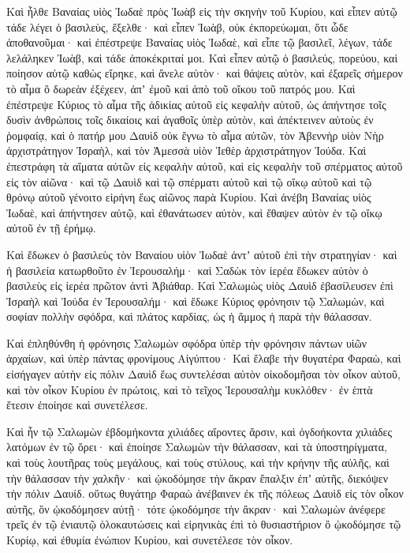 {\par }{\PP {}Καὶ ἦλθε Βαναίας υἱὸς Ἰωδαὲ πρὸς Ἰωὰβ εἰς τὴν σκηνὴν τοῦ Κυρίου, καὶ εἶπεν αὐτῷ τάδε λέγει ὁ βασιλεὺς, ἔξελθε· καὶ εἶπεν Ἰωὰβ, οὐκ ἐκπορεύωμαι, ὅτι ὧδε ἀποθανοῦμαι· καὶ ἐπέστρεψε Βαναίας υἱὸς Ἰωδαὲ, καὶ εἶπε τῷ βασιλεῖ, λέγων, τάδε λελάληκεν Ἰωὰβ, καὶ τάδε ἀποκέκριταί μοι.
Καὶ εἶπεν αὐτῷ ὁ βασιλεύς, πορεύου, καὶ ποίησον αὐτῷ καθὼς εἴρηκε, καὶ ἄνελε αὐτὸν· καὶ θάψεις αὐτὸν, καὶ ἐξαρεῖς σήμερον τὸ αἷμα ὃ δωρεὰν ἐξέχεεν, ἀπʼ ἐμοῦ καὶ ἀπὸ τοῦ οἴκου τοῦ πατρός μου.
Καὶ ἐπέστρεψε Κύριος τὸ αἷμα τῆς ἀδικίας αὐτοῦ εἰς κεφαλὴν αὐτοῦ, ὡς ἀπήντησε τοῖς δυσὶν ἀνθρώποις τοῖς δικαίοις καὶ ἀγαθοῖς ὑπὲρ αὐτὸν, καὶ ἀπέκτεινεν αὐτοὺς ἐν ῥομφαίᾳ, καὶ ὁ πατήρ μου Δαυὶδ οὐκ ἔγνω τὸ αἷμα αὐτῶν, τὸν Ἀβεννὴρ υἱὸν Νὴρ ἀρχιστράτηγον Ἰσραὴλ, καὶ τὸν Ἀμεσσὰ υἱὸν Ἰεθὲρ ἀρχιστράτηγον Ἰούδα.
Καὶ ἐπεστράφη τὰ αἵματα αὐτῶν εἰς κεφαλὴν αὐτοῦ, καὶ εἰς κεφαλὴν τοῦ σπέρματος αὐτοῦ εἰς τὸν αἰῶνα· καὶ τῷ Δαυὶδ καὶ τῷ σπέρματι αὐτοῦ καὶ τῷ οἴκῳ αὐτοῦ καὶ τῷ θρόνῳ αὐτοῦ γένοιτο εἰρήνη ἕως αἰῶνος παρὰ Κυρίου.
Καὶ ἀνέβη Βαναίας υἱὸς Ἰωδαὲ, καὶ ἀπήντησεν αὐτῷ, καὶ ἐθανάτωσεν αὐτὸν, καὶ ἔθαψεν αὐτὸν ἐν τῷ οἴκῳ αὐτοῦ ἐν τῇ ἐρήμῳ.
\par }{\PP {}Καὶ ἔδωκεν ὁ βασιλεὺς τὸν Βαναίου υἱὸν Ἰωδαὲ ἀντʼ αὐτοῦ ἐπὶ τὴν στρατηγίαν· καὶ ἡ βασιλεία κατωρθοῦτο ἐν Ἰερουσαλήμ· καὶ Σαδὼκ τὸν ἱερέα ἔδωκεν αὐτὸν ὁ βασιλεὺς εἰς ἱερέα πρῶτον ἀντὶ Ἀβιάθαρ. Καὶ Σαλωμὼς υἱὸς Δαυὶδ ἐβασίλευσεν ἐπὶ Ἰσραὴλ καὶ Ἰούδα ἐν Ἱερουσαλήμ·
καὶ ἔδωκε Κύριος φρόνησιν τῷ Σαλωμὼν, καὶ σοφίαν πολλὴν σφόδρα, καὶ πλάτος καρδίας, ὡς ἡ ἄμμος ἡ παρὰ τὴν θάλασσαν.
\par }{\PP {}Καὶ ἐπληθύνθη ἡ φρόνησις Σαλωμὼν σφόδρα ὑπὲρ τὴν φρόνησιν πάντων υἱῶν ἀρχαίων, καὶ ὑπὲρ πάντας φρονίμους Αἰγύπτου·
Καὶ ἔλαβε τὴν θυγατέρα Φαραὼ, καὶ εἰσήγαγεν αὐτὴν εἰς πόλιν Δαυὶδ ἕως συντελέσαι αὐτὸν οἰκοδομῆσαι τὸν οἶκον αὐτοῦ, καὶ τὸν οἶκον Κυρίου ἐν πρώτοις, καὶ τὸ τεῖχος Ἱερουσαλὴμ κυκλόθεν· ἐν ἑπτὰ ἔτεσιν ἐποίησε καὶ συνετέλεσε.
\par }{\PP {}Καὶ ἦν τῷ Σαλωμὼν ἐβδομήκοντα χιλιάδες αἴροντες ἄρσιν, καὶ ὀγδοήκοντα χιλιάδες λατόμων ἐν τῷ ὄρει·
καὶ ἐποίησε Σαλωμὼν τὴν θάλασσαν, καὶ τὰ ὑποστηρίγματα, καὶ τοὺς λουτῆρας τοὺς μεγάλους, καὶ τοὺς στύλους, καὶ τἠν κρήνην τῆς αὐλῆς, καὶ τὴν θάλασσαν τὴν χαλκῆν· καὶ ᾠκοδόμησε τὴν ἄκραν ἔπαλξιν ἐπʼ αὐτῆς, διεκόψεν τὴν πόλιν Δαυίδ.
οὕτως θυγάτηρ Φαραὼ ἀνέβαινεν ἐκ τῆς πόλεως Δαυὶδ εἰς τὸν οἶκον αὐτῆς, ὃν ᾠκοδόμησεν αὐτῇ· τότε ᾠκοδόμησε τὴν ἄκραν·
καὶ Σαλωμὼν ἀνέφερε τρεῖς ἐν τῷ ἐνιαυτῷ ὁλοκαυτώσεις καὶ εἰρηνικὰς ἐπὶ τὸ θυσιαστήριον ὃ ᾠκοδόμησε τῷ Κυρίῳ, καὶ ἐθυμία ἐνώπιον Κυρίου, καὶ συνετέλεσε τὸν οἶκον.
}
